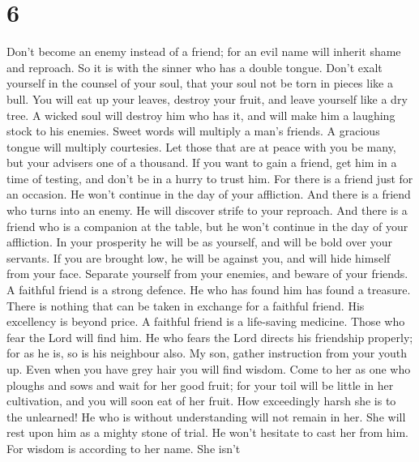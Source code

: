\hypertarget{section-4}{%
\section{6}\label{section-4}}

 Don't become an enemy instead of a friend; for an evil name
will inherit shame and reproach. So it is with the sinner who has a
double tongue.  Don't exalt yourself in the counsel of your
soul, that your soul not be torn in pieces like a bull.  You
will eat up your leaves, destroy your fruit, and leave yourself like a
dry tree.  A wicked soul will destroy him who has it, and
will make him a laughing stock to his enemies.  Sweet words
will multiply a man's friends. A gracious tongue will multiply
courtesies.  Let those that are at peace with you be many,
but your advisers one of a thousand.  If you want to gain a
friend, get him in a time of testing, and don't be in a hurry to trust
him.  For there is a friend just for an occasion. He won't
continue in the day of your affliction.  And there is a
friend who turns into an enemy. He will discover strife to your
reproach.  And there is a friend who is a companion at the
table, but he won't continue in the day of your affliction.
 In your prosperity he will be as yourself, and will be
bold over your servants.  If you are brought low, he will
be against you, and will hide himself from your face. 
Separate yourself from your enemies, and beware of your friends.
 A faithful friend is a strong defence. He who has found
him has found a treasure.  There is nothing that can be
taken in exchange for a faithful friend. His excellency is beyond price.
 A faithful friend is a life-saving medicine. Those who
fear the Lord will find him.  He who fears the Lord directs
his friendship properly; for as he is, so is his neighbour also.
 My son, gather instruction from your youth up. Even when
you have grey hair you will find wisdom.  Come to her as
one who ploughs and sows and wait for her good fruit; for your toil will
be little in her cultivation, and you will soon eat of her fruit.
 How exceedingly harsh she is to the unlearned! He who is
without understanding will not remain in her.  She will
rest upon him as a mighty stone of trial. He won't hesitate to cast her
from him.  For wisdom is according to her name. She isn't
